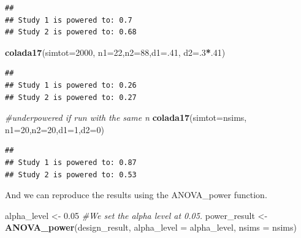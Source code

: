 \documentclass[]{book}
\newenvironment{Shaded}{\begin{snugshade}}{\end{snugshade}}
\newcommand{\CommentTok}[1]{\textcolor[rgb]{0.56,0.35,0.01}{\textit{#1}}}
\newcommand{\DataTypeTok}[1]{\textcolor[rgb]{0.13,0.29,0.53}{#1}}
\newcommand{\DecValTok}[1]{\textcolor[rgb]{0.00,0.00,0.81}{#1}}
\newcommand{\FloatTok}[1]{\textcolor[rgb]{0.00,0.00,0.81}{#1}}
\newcommand{\KeywordTok}[1]{\textcolor[rgb]{0.13,0.29,0.53}{\textbf{#1}}}
\newcommand{\NormalTok}[1]{#1}
\newcommand{\OperatorTok}[1]{\textcolor[rgb]{0.81,0.36,0.00}{\textbf{#1}}}
\newcommand{\StringTok}[1]{\textcolor[rgb]{0.31,0.60,0.02}{#1}}
\begin{document}
\begin{verbatim}
## 
## Study 1 is powered to: 0.7
## Study 2 is powered to: 0.68
\end{verbatim}

\begin{Shaded}
\begin{Highlighting}[]
  \KeywordTok{colada17}\NormalTok{(}\DataTypeTok{simtot=}\DecValTok{2000}\NormalTok{, }\DataTypeTok{n1=}\DecValTok{22}\NormalTok{,}\DataTypeTok{n2=}\DecValTok{88}\NormalTok{,}\DataTypeTok{d1=}\NormalTok{.}\DecValTok{41}\NormalTok{, }\DataTypeTok{d2=}\NormalTok{.}\DecValTok{3}\OperatorTok{*}\NormalTok{.}\DecValTok{41}\NormalTok{)}
\end{Highlighting}
\end{Shaded}

\begin{verbatim}
## 
## Study 1 is powered to: 0.26
## Study 2 is powered to: 0.27
\end{verbatim}

\begin{Shaded}
\begin{Highlighting}[]
\CommentTok{#underpowered if run with the same n}
\KeywordTok{colada17}\NormalTok{(}\DataTypeTok{simtot=}\NormalTok{nsims, }\DataTypeTok{n1=}\DecValTok{20}\NormalTok{,}\DataTypeTok{n2=}\DecValTok{20}\NormalTok{,}\DataTypeTok{d1=}\DecValTok{1}\NormalTok{,}\DataTypeTok{d2=}\DecValTok{0}\NormalTok{)  }
\end{Highlighting}
\end{Shaded}

\begin{verbatim}
## 
## Study 1 is powered to: 0.87
## Study 2 is powered to: 0.53
\end{verbatim}

And we can reproduce the results using the ANOVA\_power function.

\begin{Shaded}
\begin{Highlighting}[]
\NormalTok{alpha_level <-}\StringTok{ }\FloatTok{0.05} \CommentTok{#We set the alpha level at 0.05. }
\NormalTok{power_result <-}\StringTok{ }\KeywordTok{ANOVA_power}\NormalTok{(design_result, }\DataTypeTok{alpha_level =}\NormalTok{ alpha_level, }\DataTypeTok{nsims =}\NormalTok{ nsims)}
\end{Highlighting}
\end{Shaded}
\end{document}
